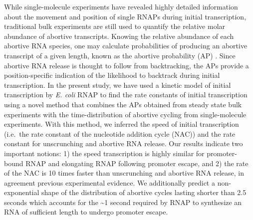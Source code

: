 While single-molecule experiments have revealed highly detailed information
about the movement and position of single RNAPs during initial transcription,
traditional bulk experiments are still used to quantify the relative molar
abundance of abortive transcripts. Knowing the relative abundance of each
abortive RNA species, one may calculate probabilities of producing an
abortive transcript of a given length, known as the abortive probability
(AP) \cite{hsu_promoter_2002, hsu_quantitative_1996}. Since abortive RNA
release is thought to follow from backtracking, the APs provide a
position-specific indication of the likelihood to backtrack during initial
transcription. In the present study, we have used a kinetic model of initial
transcription by \textit{E. coli} RNAP to find the rate constants of initial
transcription using a novel method that combines the APs obtained from steady
state bulk experiments with the time-distribution of abortive cycling from
single-molecule experiments. With this method, we inferred the speed of
initial transcription (i.e.\ the rate constant of the nucleotide addition
cycle (NAC)) and the rate constant for unscrunching and abortive RNA release.
Our results indicate two important notions: 1) the speed transcription is
highly similar for promoter-bound RNAP and elongating RNAP following promoter
escape, and 2) the rate of the NAC is 10 times faster than unscrunching and
abortive RNA release, in agreement previous experimental evidence. We
additionally predict a non-exponential shape of the distribution of abortive
cycles lasting shorter than 2.5 seconds which accounts for the \sim1 second
required by RNAP to synthesize an RNA of sufficient length to undergo promoter
escape.
